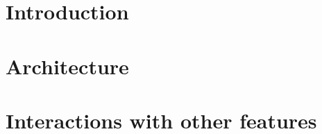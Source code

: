 



\maketitle

\tableofcontents

\chapter{Introduction}


\chapter{Architecture}











\chapter{Interactions with other features}



\printbibliography[heading=bibintoc]

\appendix





